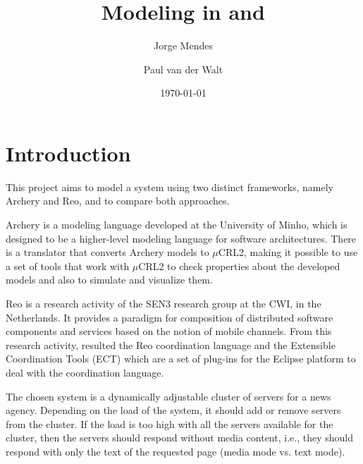 \documentclass[a4paper]{article}
\author{Jorge Mendes \and Paul van der Walt}
\date{\today}
\title{Modeling in \ar and \re}
\newcommand{\ar}{Archery\xspace}
\newcommand{\re}{Reo\xspace}
\newcommand{\mcrl}{$\mu$CRL2\xspace}
\begin{document}
\maketitle

%
%
\section{Introduction}

This project aims to model a system using two distinct frameworks, namely \ar
and \re, and to compare both approaches.

\ar is a modeling language developed at the University of Minho, which is designed
to be a higher-level modeling language for software architectures. There is a translator
that converts \ar models to \mcrl, making it possible to use a set of tools that work with
\mcrl to check properties about the developed models and also to simulate and visualize them.

\re is a research activity of the SEN3 research group at the CWI, in the
Netherlands. It provides a paradigm for composition of distributed software
components and services based on the notion of mobile channels.
From this research activity, resulted the \re coordination language and the
Extensible Coordination Tools (ECT) which are a set of plug-ins for the Eclipse
platform to deal with the coordination language.

The chosen system is a dynamically adjustable cluster of servers for a news
agency. Depending on the load of the system, it should add or remove servers
from the cluster. If the load is too high with all the servers available for
the cluster, then the servers should respond without media content, i.e., they
should respond with only the text of the requested page (media mode vs. text
mode).

%
%
%
\end{document}
